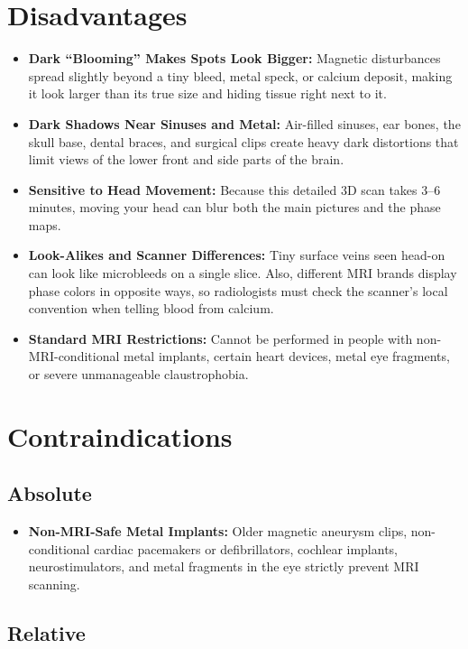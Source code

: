 \section{Disadvantages}

\begin{itemize}
    \item \textbf{Dark ``Blooming'' Makes Spots Look Bigger:} Magnetic disturbances spread slightly beyond a tiny bleed, metal speck, or calcium deposit, making it look larger than its true size and hiding tissue right next to it.
    \item \textbf{Dark Shadows Near Sinuses and Metal:} Air-filled sinuses, ear bones, the skull base, dental braces, and surgical clips create heavy dark distortions that limit views of the lower front and side parts of the brain.
    \item \textbf{Sensitive to Head Movement:} Because this detailed 3D scan takes 3--6 minutes, moving your head can blur both the main pictures and the phase maps.
    \item \textbf{Look-Alikes and Scanner Differences:} Tiny surface veins seen head-on can look like microbleeds on a single slice. Also, different MRI brands display phase colors in opposite ways, so radiologists must check the scanner's local convention when telling blood from calcium.
    \item \textbf{Standard MRI Restrictions:} Cannot be performed in people with non-MRI-conditional metal implants, certain heart devices, metal eye fragments, or severe unmanageable claustrophobia.
\end{itemize}

\section{Contraindications}

\subsection{Absolute}

\begin{itemize}
    \item \textbf{Non-MRI-Safe Metal Implants:} Older magnetic aneurysm clips, non-conditional cardiac pacemakers or defibrillators, cochlear implants, neurostimulators, and metal fragments in the eye strictly prevent MRI scanning.
\end{itemize}

\subsection{Relative}

